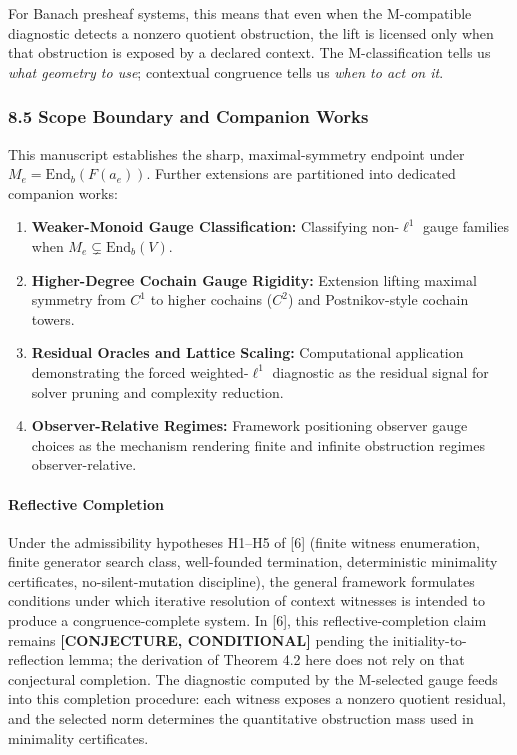 \documentclass[
  11pt,
]{article}
\providecommand{\tightlist}{%
  \setlength{\itemsep}{0pt}\setlength{\parskip}{0pt}}
\providecommand{\tightlist}{%
  \setlength{\itemsep}{0pt}\setlength{\parskip}{0pt}}
\begin{document}
For Banach presheaf systems, this means that even when the M-compatible diagnostic detects a nonzero quotient obstruction, the lift is licensed only when that obstruction is exposed by a declared context. The M-classification tells us \emph{what geometry to use}; contextual congruence tells us \emph{when to act on it}.

\subsubsection{8.5 Scope Boundary and Companion Works}\label{scope-boundary-and-companion-works}

This manuscript establishes the sharp, maximal-symmetry endpoint under \(M_e = \mathrm{End}_b(F(a_e))\). Further extensions are partitioned into dedicated companion works:

\begin{enumerate}
\def\labelenumi{\arabic{enumi}.}
\tightlist
\item
  \textbf{Weaker-Monoid Gauge Classification:} Classifying non-\(\ell^1\) gauge families when \(M_e \subsetneq \mathrm{End}_b(V)\).
\item
  \textbf{Higher-Degree Cochain Gauge Rigidity:} Extension lifting maximal symmetry from \(C^1\) to higher cochains (\(C^2\)) and Postnikov-style cochain towers.
\item
  \textbf{Residual Oracles and Lattice Scaling:} Computational application demonstrating the forced weighted-\(\ell^1\) diagnostic as the residual signal for solver pruning and complexity reduction.
\item
  \textbf{Observer-Relative Regimes:} Framework positioning observer gauge choices as the mechanism rendering finite and infinite obstruction regimes observer-relative.
\end{enumerate}

\paragraph{Reflective Completion}\label{reflective-completion}

Under the admissibility hypotheses H1--H5 of {[}6{]} (finite witness enumeration, finite generator search class, well-founded termination, deterministic minimality certificates, no-silent-mutation discipline), the general framework formulates conditions under which iterative resolution of context witnesses is intended to produce a congruence-complete system. In {[}6{]}, this reflective-completion claim remains \textbf{{[}CONJECTURE, CONDITIONAL{]}} pending the initiality-to-reflection lemma; the derivation of Theorem 4.2 here does not rely on that conjectural completion. The diagnostic computed by the M-selected gauge feeds into this completion procedure: each witness exposes a nonzero quotient residual, and the selected norm determines the quantitative obstruction mass used in minimality certificates.
\end{document}
